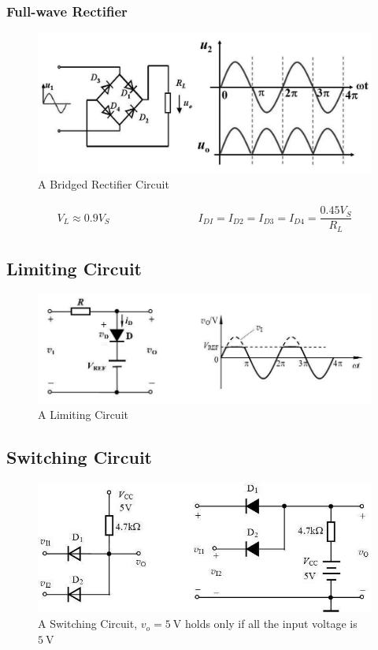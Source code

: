 \subsubsection{Full-wave Rectifier}

\begin{figure}[H]
  \centering
  \includegraphics[width=0.9\linewidth]{figures/BridgedRectifierCircuit}
  \caption{A Bridged Rectifier Circuit}
\end{figure}

\begin{equation*}
  \begin{aligned}
    V_L \approx 0.9 V_S \quad\quad \quad\quad \quad\quad \quad\quad  I_{DI} = I_{D2} = I_{D3} = I_{D4} = \dfrac{0.45 V_S}{R_L} 
  \end{aligned}
\end{equation*}

\subsection{Limiting Circuit}

\begin{figure}[H]
  \centering
  \includegraphics[width=0.8\linewidth]{figures/LimitingCircuit}
  \caption{A Limiting Circuit}
\end{figure}

\subsection{Switching Circuit}

\begin{figure}[H]
  \centering
  \includegraphics[width=0.8\linewidth]{figures/SwitchCircuit}
  \caption{A Switching Circuit, $v_o = 5 \  \mathrm{V}$ holds only if all the input voltage is $5 \  \mathrm{V}$}
\end{figure}

